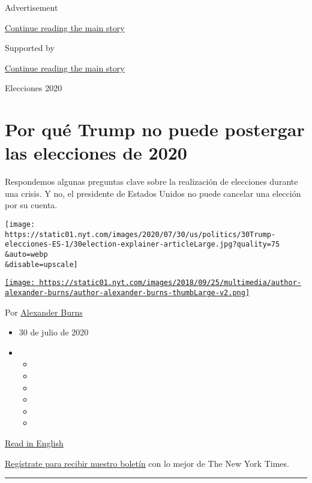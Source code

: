 Advertisement

\protect\hyperlink{after-top}{Continue reading the main story}

Supported by

\protect\hyperlink{after-sponsor}{Continue reading the main story}

Elecciones 2020

\hypertarget{por-quuxe9-trump-no-puede-postergar-las-elecciones-de-2020}{%
\section{Por qué Trump no puede postergar las elecciones de
2020}\label{por-quuxe9-trump-no-puede-postergar-las-elecciones-de-2020}}

Respondemos algunas preguntas clave sobre la realización de elecciones
durante una crisis. Y no, el presidente de Estados Unidos no puede
cancelar una elección por su cuenta.

\texttt{[image: https://static01.nyt.com/images/2020/07/30/us/politics/30Trump-elecciones-ES-1/30election-explainer-articleLarge.jpg?quality=75\\\&auto=webp\\\&disable=upscale]}

\href{https://www.nytimes.com/by/alexander-burns}{\texttt{[image: https://static01.nyt.com/images/2018/09/25/multimedia/author-alexander-burns/author-alexander-burns-thumbLarge-v2.png]}}

Por \href{https://www.nytimes.com/by/alexander-burns}{Alexander Burns}

\begin{itemize}
\item
  30 de julio de 2020
\item
  \begin{itemize}
  \item
  \item
  \item
  \item
  \item
  \item
  \end{itemize}
\end{itemize}

\href{https://www.nytimes.com/2020/07/30/us/politics/trump-postpone-election.html}{Read
in English}

\href{https://www.nytimes.com/newsletters/el-times}{Regístrate para
recibir nuestro boletín} con lo mejor de The New York Times.

\begin{center}\rule{0.5\linewidth}{\linethickness}\end{center}

